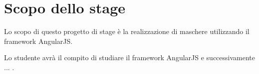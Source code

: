 \section*{Scopo dello stage}
Lo scopo di questo progetto di stage è la realizzazione di maschere utilizzando il framework AngularJS.

Lo studente avrà il compito di studiare il framework AngularJS e successivamente ... .

